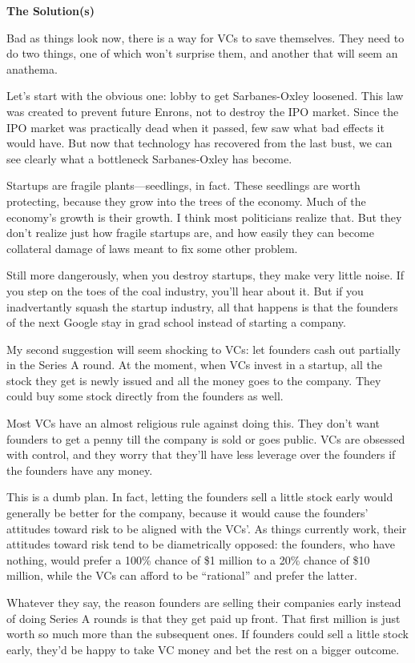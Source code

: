 \textbf{The Solution(s)}

Bad as things look now, there is a way for VCs to save themselves. They
need to do two things, one of which won't surprise them, and another
that will seem an anathema.

Let's start with the obvious one: lobby to get Sarbanes-Oxley loosened.
This law was created to prevent future Enrons, not to destroy the IPO
market. Since the IPO market was practically dead when it passed, few
saw what bad effects it would have. But now that technology has
recovered from the last bust, we can see clearly what a bottleneck
Sarbanes-Oxley has become.

Startups are fragile plants---seedlings, in fact. These seedlings are
worth protecting, because they grow into the trees of the economy. Much
of the economy's growth is their growth. I think most politicians
realize that. But they don't realize just how fragile startups are, and
how easily they can become collateral damage of laws meant to fix some
other problem.

Still more dangerously, when you destroy startups, they make very little
noise. If you step on the toes of the coal industry, you'll hear about
it. But if you inadvertantly squash the startup industry, all that
happens is that the founders of the next Google stay in grad school
instead of starting a company.

My second suggestion will seem shocking to VCs: let founders cash out
partially in the Series A round. At the moment, when VCs invest in a
startup, all the stock they get is newly issued and all the money goes
to the company. They could buy some stock directly from the founders as
well.

Most VCs have an almost religious rule against doing this. They don't
want founders to get a penny till the company is sold or goes public.
VCs are obsessed with control, and they worry that they'll have less
leverage over the founders if the founders have any money.

This is a dumb plan. In fact, letting the founders sell a little stock
early would generally be better for the company, because it would cause
the founders' attitudes toward risk to be aligned with the VCs'. As
things currently work, their attitudes toward risk tend to be
diametrically opposed: the founders, who have nothing, would prefer a
100\% chance of \$1 million to a 20\% chance of \$10 million, while the
VCs can afford to be ``rational'' and prefer the latter.

Whatever they say, the reason founders are selling their companies early
instead of doing Series A rounds is that they get paid up front. That
first million is just worth so much more than the subsequent ones. If
founders could sell a little stock early, they'd be happy to take VC
money and bet the rest on a bigger outcome.

